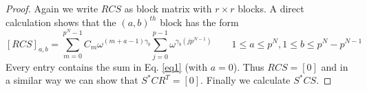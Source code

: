 \documentclass[preprint,12pt]{elsarticle}
\theoremstyle{definition}
\theoremstyle{remark}
\begin{document}
\begin{proof}
Again we write $RCS$ as block matrix with $r\times r$ blocks. A direct calculation shows that the $ (a,b)^{th} $ block has the form $$ \left[RCS \right]_{a,b}= {\sum\limits_{m = 0}^{{p^N} - 1} {C_m}{\omega^{(m+a-1)\gamma_b}\sum\limits_{j=0}^{p-1}{\omega ^{\gamma _b(jp^{N-1})}}} } \qquad 1\leq a \leq p^N, 1\leq b \leq p^N-p^{N-1}\  $$
Every entry contains the sum in Eq. \ref{eq1} (with $a=0$). Thus $RCS=\left[0\right]$ and in a similar way we can show that $S^*CR^T=\left[0\right]$. Finally we calculate $S^*CS$.

\end{proof}
\end{document}
